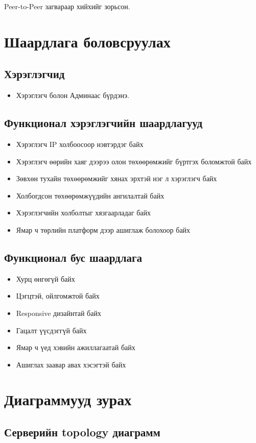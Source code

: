 \quad \quad Peer-to-Peer загвараар хийхийг зорьсон.
\section{Шаардлага боловсруулах}
  \subsection{Хэрэглэгчид}
    \begin{itemize}
        \item Хэрэглэгч болон Админаас бүрдэнэ.
    \end{itemize}
	\subsection{Функционал хэрэглэгчийн шаардлагууд}
     \begin{itemize}
        \item Хэрэглэгч IP холбоосоор нэвтэрдэг байх
        \item Хэрэглэгч өөрийн хаяг дээрээ олон төхөөрөмжийг бүртгэх боломжтой байх
        \item Зөвхөн тухайн төхөөрөмжийг хянах эрхтэй нэг л хэрэглэгч байх
        \item Холбогдсон төхөөрөмжүүдийн ангилалтай байх
        \item Хэрэглэгчийн холболтыг хязгаарладаг байх
        \item Ямар ч төрлийн платформ дээр ашиглаж болохоор байх
    \end{itemize}
  \subsection{Функционал бус шаардлага}
    \begin{itemize}
        \item Хурц өнгөгүй байх
        \item Цэгцтэй, ойлгомжтой байх
        \item Responsive дизайнтай байх
        \item Гацалт үүсдэггүй байх
        \item Ямар ч үед хэвийн ажиллагаатай байх
        \item Ашиглах заавар авах хэсэгтэй байх
    \end{itemize}
\section{Диаграммууд зурах}
	\subsection{Серверийн topology диаграмм}	

